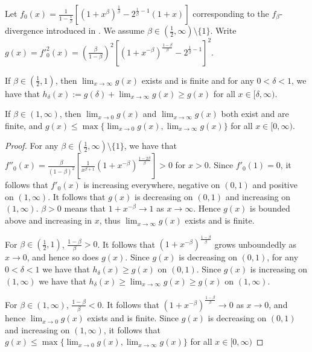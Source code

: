 \begin{lemma}\label{lemma:upper-bound-f-beta}
Let $f_0(x) = \frac{1}{1-\frac{1}{\beta}}\left[ \left(1+x^\beta\right)^\frac{1}{\beta}  - 2^{\frac{1}{\beta} - 1}(1+x)\right]$
corresponding to the ${f_\beta}$-divergence introduced in \cite{osterreicher2003new}.
We assume $\beta \in \left( \frac{1}{2}, \infty\right) \setminus \{1\}$.
Write $g(x) = f'^2_0(x) = \left(\frac{\beta}{1-\beta}\right)^2\left[ \left(1+x^{-\beta}\right)^\frac{1-\beta}{\beta}  - 2^{\frac{1}{\beta} - 1}\right]^2$.

If $\beta \in \left(\frac{1}{2}, 1\right)$, then $\lim_{x\to \infty}g(x)$ exists and is finite and for any $0<\delta<1$, we have that $h_\delta(x) := g(\delta) + \lim_{x\to \infty}g(x) \geq g(x)$ for all $x\in[\delta, \infty)$.

If $\beta \in \left(1, \infty \right)$, then $\lim_{x\to0}g(x)$ and $\lim_{x\to \infty}g(x)$ both exist and are finite, and $g(x) \leq \max\{\lim_{x\to0}g(x), \lim_{x\to \infty}g(x)\}$ for all $x\in[0, \infty)$.
\end{lemma}
\begin{proof}
For any $\beta \in \left( \frac{1}{2}, \infty\right) \setminus \{1\}$, we have that $f''_0(x) = \frac{\beta}{(1-\beta)^2} \left[ 
\frac{1}{x^{\beta+1}} \left( 1 + x^{-\beta}\right)^{\frac{1-2\beta}{\beta}}\right] > 0$ for $x>0$.
Since $f'_0(1)=0$, it follows that $f'_0(x)$ is increasing everywhere, negative on $(0,1)$ and positive on $(1,\infty)$.
It follows that $g(x)$ is decreasing on $(0,1)$ and increasing on $(1,\infty)$.
$\beta > 0$ means that $1+x^{-\beta} \to 1$ as $x\to \infty$. Hence $g(x)$ is bounded above and increasing in $x$, thus $\lim_{x\to\infty} g(x)$ exists and is finite.

For $\beta \in (\frac{1}{2}, 1)$, $\frac{1-\beta}{\beta} > 0$. 
It follows that $\left(1+x^{-\beta}\right)^\frac{1-\beta}{\beta}$ grows unboundedly as $x \to 0$, and hence so does $g(x)$.
Since $g(x)$ is decreasing on $(0,1)$, for any $0<\delta<1$ we have that $h_\delta(x)\geq g(x)$ on $(0,1)$.
Since $g(x)$ is increasing on $(1, \infty)$ we have that $h_\delta(x) \geq \lim_{x\to\infty} g(x) \geq g(x)$ on $(1,\infty)$.

For $\beta \in (1, \infty)$, $\frac{1-\beta}{\beta} < 0$. 
It follows that $\left(1+x^{-\beta}\right)^\frac{1-\beta}{\beta} \to 0$ as $x \to 0$, and hence $\lim_{x\to 0}g(x)$ exists and is finite.
Since $g(x)$ is decreasing on $(0,1)$ and increasing on $(1,\infty)$, it follows that 
$g(x) \leq \max\{\lim_{x\to 0}g(x), \lim_{x\to \infty}g(x)\}$ for all $x\in [0, \infty)$
\end{proof}


